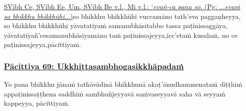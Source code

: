 {{{		\hypertarget{endnote359-appendix}{\hyperlink{endnote359-body}{SVibh Ce, SVibh Ee, Um, SVibh Be v.l., Mi v.l.: `\textit{evañ-ca pana so}. (Pg: ...\textit{evaṁ so bhikkhu bhikkhūhi}...)}}}}}\makeatother \thinspace so bhikkhu bhikkhūhi vuccamāno tath'eva paggaṇheyya, so bhikkhu bhikkhūhi yāvatatiyaṁ samanubhāsitabbo tassa paṭinissaggāya, yāvatatiyañ'ce\makeatletter\hyperlink{endnote360-appendix}\makeatother \thinspace samanubhāsiyamāno taṁ paṭinissajeyya,\makeatletter\hyperlink{endnote361-appendix}\makeatother \thinspace icc'etaṁ kusalaṁ, no ce paṭinissajeyya,\makeatletter\hyperlink{endnote362-appendix}\makeatother \thinspace pācittiyaṁ.



\subsubsection*{\hyperref[exp69]{Pācittiya 69: Ukkhittasambhogasikkhāpadaṁ}}
\label{pac69}

Yo pana bhikkhu jānaṁ tathāvādinā bhikkhunā akaṭ'ānudhammena\makeatletter\hyperlink{endnote363-appendix}\makeatother \thinspace taṁ diṭṭhiṁ appaṭinissaṭṭhena saddhiṁ sambhuñjeyya\makeatletter\hyperlink{endnote364-appendix}\makeatother \thinspace vā saṁvaseyya\makeatletter\hyperlink{endnote365-appendix}\makeatother \thinspace vā saha vā seyyaṁ kappeyya, pācittiyaṁ.



